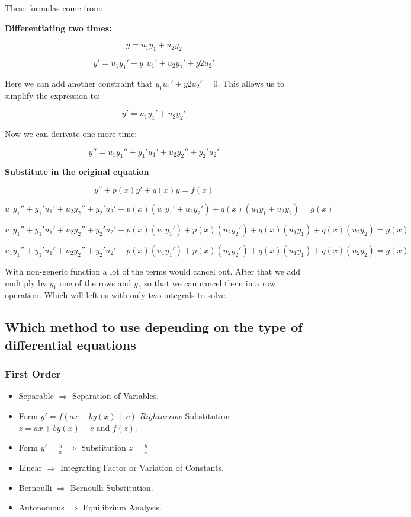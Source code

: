 These formulas come from:
\vspace{\baselineskip}

\textbf{Differentiating two times:}

\[
y = u_1 y_1 + u_2 y_2
\]

\[
y' = u_1 y_{1}' + y_1 u_{1}' +  u_2 y_{2}' + y{2} u_{2}'
\]

Here we can add another constraint that \(y_1 u_{1}' + y{2} u_{2}' = 0\). This allows us to
simplify the expression to:

\[
y' = u_1 y_{1}' +  u_2 y_{2}'
\]

Now we can derivate one more time:

\[
y'' =  u_1 y_{1}'' + y_{1}' u_{1}'  + u_2 y_{2}'' + y_{2}' u_{2}'
\]


\textbf{Substitute in the original equation}

\[
y'' + p(x)y' + q(x)y = f(x)
\]

\[
 u_1 y_{1}'' + y_{1}' u_{1}'  + u_2 y_{2}'' + y_{2}' u_{2}' + p(x)(u_1 y_{1}' +  u_2 y_{2}') + q(x)(u_1 y_1 + u_2 y_2) = g(x)  
\]

\[
 u_1 y_{1}'' + y_{1}' u_{1}'  + u_2 y_{2}'' + y_{2}' u_{2}' + p(x)(u_1 y_{1}') + p(x)(u_2 y_{2}') + q(x)(u_1 y_1) + q(x)(u_2 y_2) = g(x)  
\]

\[
 u_1 y_{1}'' + y_{1}' u_{1}'  + u_2 y_{2}'' + y_{2}' u_{2}' + p(x)(u_1 y_{1}') + p(x)(u_2 y_{2}') + q(x)(u_1 y_1) + q(x)(u_2 y_2) = g(x)  
\]

With non-generic function a lot of the terms would cancel out. After that we add multiply by
\(y_1\) one of the rows and \(y_2\) so that we can cancel them in a row operation. Which will left us
with only two integrals to solve.

\subsection{Which method to use depending on the type of differential equations}

\subsubsection{First Order}

\begin{itemize}[label=\(-\)]
    \item Separable \(\Rightarrow\) Separation of Variables.
    \item Form \(y' = f(ax + by(x) + c)\) \(Rightarrow\) Substitution \(z = ax + by(x) + c\) and \(f(z)\).
    \item Form \(y' = \frac{y}{x}\) \(\Rightarrow\) Substitution \(z = \frac{y}{x}\)
    \item Linear \(\Rightarrow\) Integrating Factor or Variation of Constants.
    \item Bernoulli \(\Rightarrow\) Bernoulli Substitution.
    \item Autonomous \(\Rightarrow\) Equilibrium Analysis.
\end{itemize}


